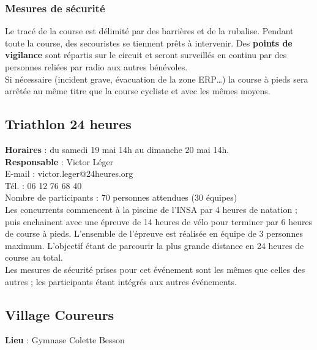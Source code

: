 \documentclass[hidelinks, paper=a4, fontsize=13pt]{report}
\begin{document}
\subsubsection{Mesures de sécurité}



Le tracé de la course est délimité par des barrières et de la rubalise. Pendant toute la course, des secouristes se tiennent prêts à intervenir. 
Des \textbf{points de vigilance} sont répartis sur le circuit et seront surveillés en continu par des personnes reliées par radio aux autres bénévoles.\\

Si nécessaire (incident grave, évacuation de la zone ERP…) la course à pieds sera arrêtée au même titre que la course cycliste et avec les mêmes moyens. 

\subsection{Triathlon 24 heures}

\textbf{Horaires} : du samedi 19 mai 14h au dimanche 20 mai 14h.\\

\textbf{Responsable} :  Victor Léger\\
	E-mail : victor.leger@24heures.org\\
	Tél. : 06 12 76 68 40\\

Nombre de participants : 70 personnes attendues (30 équipes)\\

Les concurrents commencent à la piscine de l’INSA par 4 heures de natation ; puis enchainent avec une épreuve de 14 heures de vélo pour terminer par 6 heures de course à pieds. L'ensemble de l'épreuve est réalisée en équipe de 3 personnes maximum. L’objectif étant de parcourir la plus grande distance en 24 heures de course au total.\\

Les mesures de sécurité prises pour cet événement sont les mêmes que celles des autres ; les participants étant intégrés aux autres événements.\\

\subsection{Village Coureurs}

\textbf{Lieu} : Gymnase Colette Besson\\
\end{document}
